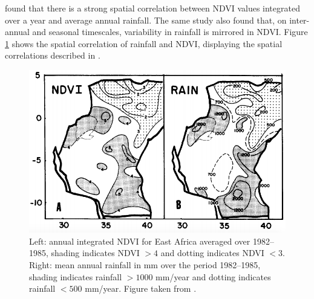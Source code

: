 \cite{nicholson1990} found that there is a strong spatial correlation between
NDVI values integrated over a year and average annual rainfall. The same study
also found that, on inter-annual and seasonal timescales, variability in rainfall
is mirrored in NDVI. Figure \ref{fig:ndvi_rain} shows the spatial correlation of
rainfall and NDVI, displaying the spatial correlations described in
\cite{nicholson1990}.
\begin{figure}
  \centering
  \includegraphics[width=0.9\linewidth]{figures/ndvi_rain}
  \caption{Left: annual integrated NDVI for East Africa averaged over 1982--1985,
    shading indicates NDVI ${>}4$ and dotting indicates NDVI ${<}3$. Right: mean
    annual rainfall in mm over the period 1982--1985, shading indicates rainfall
    ${>}1000$ mm/year and dotting indicates rainfall ${<}500$ mm/year. Figure
    taken from \cite{nicholson1990}.}
  \label{fig:ndvi_rain}
\end{figure}
